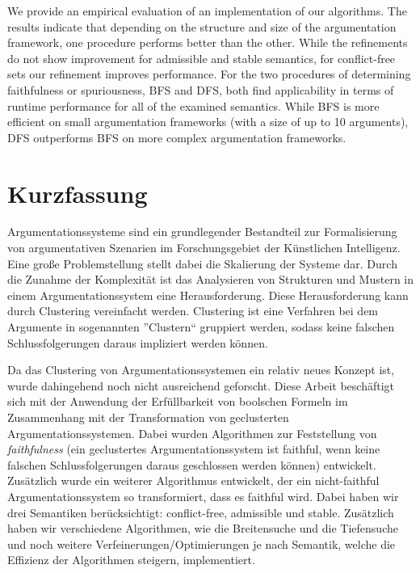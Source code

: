 \documentclass[twoside,openright]{scrreprt}
\begin{document}
We provide an empirical evaluation of an implementation of our algorithms. The results indicate that depending on the structure and size of the argumentation framework, one procedure performs better than the other. While the refinements do not show improvement for admissible and stable semantics, for conflict-free sets our refinement improves performance. For the two procedures of determining faithfulness or spuriousness, BFS and DFS, both find applicability in terms of runtime performance for all of the examined semantics. While BFS is more efficient on small argumentation frameworks (with a size of up to 10 arguments), DFS outperforms BFS on more complex argumentation frameworks.







\chapter*{Kurzfassung}

Argumentationssysteme sind ein grundlegender Bestandteil zur Formalisierung von argumentativen Szenarien im Forschungsgebiet der Künstlichen Intelligenz. Eine große Problemstellung stellt dabei die Skalierung der Systeme dar. Durch die Zunahme der Komplexität ist das Analysieren von Strukturen und Mustern in einem Argumentationssystem eine Herausforderung. Diese Herausforderung kann durch Clustering vereinfacht werden. Clustering ist eine Verfahren bei dem Argumente in sogenannten ''Clustern`` gruppiert werden, sodass keine falschen Schlussfolgerungen daraus impliziert werden können.

Da das Clustering von Argumentationssystemen ein relativ neues Konzept ist, wurde dahingehend noch nicht ausreichend geforscht. Diese Arbeit beschäftigt sich mit der Anwendung der Erfüllbarkeit von boolschen Formeln im Zusammenhang mit der Transformation von geclusterten Argumentationssystemen. Dabei wurden Algorithmen zur Feststellung von \emph{faithfulness} (ein geclustertes Argumentationssystem ist faithful, wenn keine falschen Schlussfolgerungen daraus geschlossen werden können) entwickelt. Zusätzlich wurde ein weiterer Algorithmus entwickelt, der ein nicht-faithful Argumentationssystem so transformiert, dass es faithful wird. Dabei haben wir drei Semantiken berücksichtigt: conflict-free, admissible und stable. Zusätzlich haben wir verschiedene Algorithmen, wie die Breitensuche und die Tiefensuche und noch weitere Verfeinerungen/Optimierungen je nach Semantik, welche die Effizienz der Algorithmen steigern, implementiert.
\end{document}
